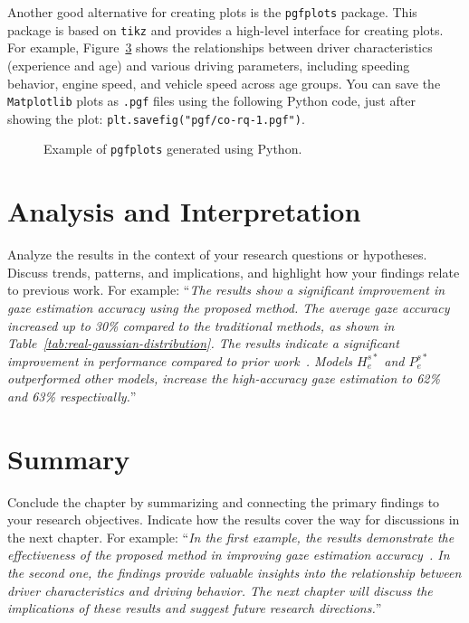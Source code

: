 Another good alternative for creating plots is the \texttt{pgfplots} package. This package is based on \texttt{tikz} and provides a high-level interface for creating plots. For example, Figure~\ref{fig:correlation-analysis} shows the relationships between driver characteristics (experience and age) and various driving parameters, including speeding behavior, engine speed, and vehicle speed across age groups. You can save the \texttt{Matplotlib} plots as \texttt{.pgf} files using the following Python code, just after showing the plot: \texttt{plt.savefig("pgf/co-rq-1.pgf")}.
\begin{figure}[!ht]
    \centering
    \begin{subfigure}[b]{0.49\textwidth}
        \caption{}
        \label{fig:correlation-analysis-a}
        \resizebox{\textwidth}{!}{%
            
        }
    \end{subfigure}
    \begin{subfigure}[b]{0.49\textwidth}
        \caption{}
        \label{fig:correlation-analysis-c}
        \resizebox{\textwidth}{!}{%
            
        }
    \end{subfigure}
    \caption{Example of \texttt{pgfplots} generated using Python.}
    \label{fig:correlation-analysis}
\end{figure}

\section{Analysis and Interpretation}\label{sec:analysis-interpretation}
Analyze the results in the context of your research questions or hypotheses. Discuss trends, patterns, and implications, and highlight how your findings relate to previous work. For example: ``\textit{The results show a significant improvement in gaze estimation accuracy using the proposed method. The average gaze accuracy increased up to 30\% compared to the traditional methods, as shown in Table~\ref{tab:real-gaussian-distribution}. The results indicate a significant improvement in performance compared to prior work~\cite{Narcizo2017}. Models $H_e^{s*}$ and $P_e^{s*}$ outperformed other models, increase the high-accuracy gaze estimation to 62\% and 63\% respectivally.}''

\section{Summary}\label{sec:results-summary}
Conclude the chapter by summarizing and connecting the primary findings to your research objectives. Indicate how the results cover the way for discussions in the next chapter. For example: ``\textit{In the first example, the results demonstrate the effectiveness of the proposed method in improving gaze estimation accuracy~\cite{Narcizo2021}. In the second one, the findings provide valuable insights into the relationship between driver characteristics and driving behavior. The next chapter will discuss the implications of these results and suggest future research directions.}''
